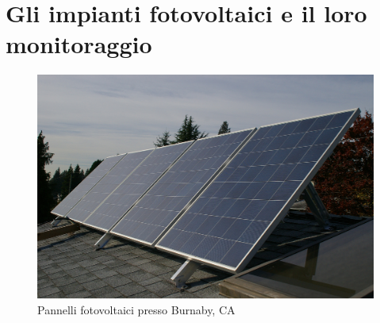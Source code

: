 \clearpage{\pagestyle{empty}\cleardoublepage}
\chapter{Gli impianti fotovoltaici e il loro monitoraggio}
%
\begin{figure}[!h]
\centering
\includegraphics[width=350pt]{img/photovoltaic-plant.png}
\caption{Pannelli fotovoltaici presso Burnaby, CA}
\end{figure}
%


